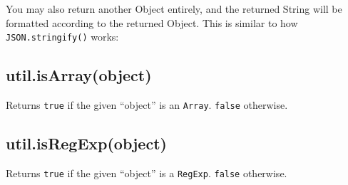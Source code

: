 You may also return another Object entirely, and the returned String
will be formatted according to the returned Object. This is similar to
how \texttt{JSON.stringify()} works:

\begin{Shaded}
\begin{Highlighting}[]
 \NormalTok{: } \NormalTok{\};}
 \NormalTok{= }
   \NormalTok{\{ }\NormalTok{: } \NormalTok{\};}
\NormalTok{\};}

\end{Highlighting}
\end{Shaded}

\subsection{util.isArray(object)}

Returns \texttt{true} if the given ``object'' is an \texttt{Array}.
\texttt{false} otherwise.

\begin{Shaded}
\begin{Highlighting}[]
 \NormalTok{);}

\NormalTok{([])}
\NormalTok{(} \NormalTok{)}
\NormalTok{(\{\})}
\end{Highlighting}
\end{Shaded}

\subsection{util.isRegExp(object)}

Returns \texttt{true} if the given ``object'' is a \texttt{RegExp}.
\texttt{false} otherwise.

\begin{Shaded}
\begin{Highlighting}[]
 \NormalTok{);}

\NormalTok{(}\OtherTok{/}\OtherTok{/}\NormalTok{)}
\NormalTok{(} \NormalTok{(}\NormalTok{))}
\NormalTok{(\{\})}
\end{Highlighting}
\end{Shaded}

